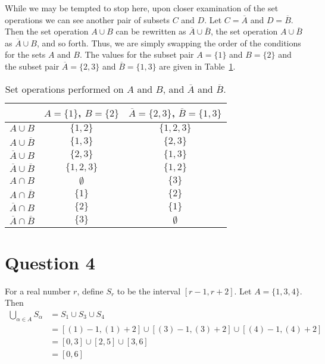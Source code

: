\documentclass[11pt, oneside]{article}   	%
\begin{document}
While we may be tempted to stop here, upon closer examination of the set operations we can see another pair of subsets $C$ and $D$. Let $C = \overline{A}$ and $D = \overline{B}$. Then the set operation $A \cup B$ can be rewritten as $\overline{A} \cup \overline{B}$, the set operation $A \cup \overline{B}$ as $\overline{A} \cup B$, and so forth. Thus, we are simply swapping the order of the conditions for the sets $A$ and $B$. The values for the subset pair $A = \{1\}$ and $B = \{2\}$ and the subset pair $\overline{A} = \{2, 3\}$ and $\overline{B} = \{1,3\}$ are given in Table~\ref{set operations}.

\begin{table}[h]                                          %
\begin{center}
\begin{tabular}{c | c | c}
    
    & $A = \{1\}$, $B = \{2\}$ & $\overline{A} = \{2, 3\}$, $\overline{B} = \{1,3\}$ \\
    \hline
    $A \cup B$ & $\{1,2\}$ & $\{1,2,3\}$ \\
    $A \cup \overline{B}$ & $\{1,3\}$ & $\{2,3\}$ \\
    $\overline{A} \cup B$ & $\{2,3\}$ & $\{1,3\}$ \\
    $\overline{A} \cup \overline{B}$ & $\{1,2,3\}$ & $\{1,2\}$ \\
    \hline
    $A \cap B$ & $\emptyset$ & $\{3\}$ \\
    $A \cap \overline{B}$ & $\{1\}$ & $\{2\}$ \\
    $\overline{A} \cap B$ & $\{2\}$ & $\{1\}$ \\
    $\overline{A} \cap \overline{B}$ & $\{3\}$ & $\emptyset$ \\

\end{tabular}
\end{center}
\caption{Set operations performed on $A$ and $B$, and $\overline{A}$ and $\overline{B}$.}
\label{set operations}
\end{table}


\section*{Question 4}

For a real number $r$, define $S_r$ to be the interval $[r-1, r+2]$. Let $A=\{1,3,4\}$. Then
\begin{align*}
\bigcup_{\alpha \in A} S_{\alpha} & = S_1 \cup S_3 \cup S_4 \\
& = [(1)-1, (1)+2] \cup [(3)-1, (3)+2] \cup [(4)-1, (4)+2] \\
& = [0, 3] \cup [2,5] \cup [3,6] \\
& =[0,6]
\end{align*}
\end{document}
